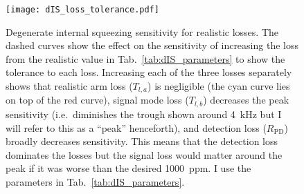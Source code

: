 \begin{figure}
	\centering
	\texttt{[image: dIS\_loss\_tolerance.pdf]}
	\caption{Degenerate internal squeezing sensitivity for realistic losses. The dashed curves show the effect on the sensitivity of increasing the loss from the realistic value in Tab.~\ref{tab:dIS_parameters} to show the tolerance to each loss. Increasing each of the three losses separately shows that realistic arm loss ($T_{l,a}$) is negligible (the cyan curve lies on top of the red curve), signal mode loss ($T_{l,b}$) decreases the peak sensitivity (i.e.\ diminishes the trough shown around 4~kHz but I will refer to this as a ``peak'' henceforth), and detection loss ($R_\text{PD}$) broadly decreases sensitivity. This means that the detection loss dominates the losses but the signal loss would matter around the peak if it was worse than the desired 1000~ppm. I use the parameters in Tab.~\ref{tab:dIS_parameters}.}
	\label{fig:dIS_loss_tolerance}
\end{figure}



